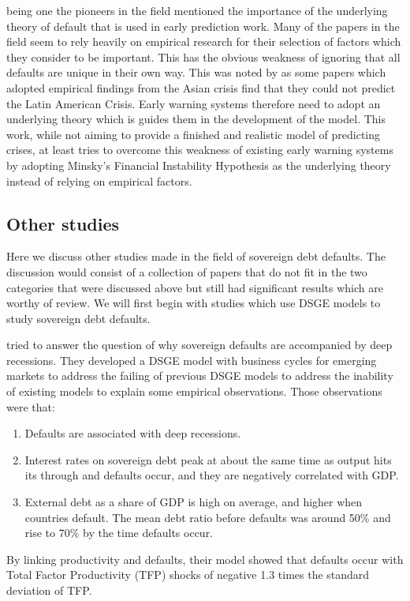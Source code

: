 \documentclass[12pt, a4paper]{article}
\begin{document}
	 being one the pioneers in the field mentioned the importance of the underlying theory of default that is used in early prediction work. Many of the papers in the field seem to rely heavily on empirical research for their selection of factors which they consider to be important. This has the obvious weakness of ignoring that all defaults are unique in their own way. This was noted by  as some papers which adopted empirical findings from the Asian crisis find that they could not predict the Latin American Crisis. Early warning systems therefore need to adopt an underlying theory which is guides them in the development of the model. This work, while not aiming to provide a finished and realistic model of predicting crises, at least tries to overcome this weakness of existing early warning systems by adopting Minsky's Financial Instability Hypothesis as the underlying theory instead of relying on empirical factors.
	
	\subsection{Other studies}
	Here we discuss other studies made in the field of sovereign debt defaults. The discussion would consist of a collection of papers that do not fit in the two categories that were discussed above but still had significant results which are worthy of review. We will first begin with studies which use DSGE models to study sovereign debt defaults.
	
	 tried to answer the question of why sovereign defaults are accompanied by deep recessions. They developed a DSGE model with business cycles for emerging markets to address the failing of previous DSGE models to address the inability of existing models to explain some empirical observations. Those observations were that:
	\begin{enumerate}
		\item Defaults are associated with deep recessions.
		\item Interest rates on sovereign debt peak at about the same time as output hits its through and defaults occur, and they are negatively correlated with GDP.
		\item External debt as a share of GDP is high on average, and higher when countries default. The mean debt ratio before defaults was around 50\% and rise to 70\% by the time defaults occur.
	\end{enumerate}
	By linking productivity and defaults, their model showed that defaults occur with Total Factor Productivity (TFP) shocks of negative 1.3 times the standard deviation of TFP.
	
\end{document}
